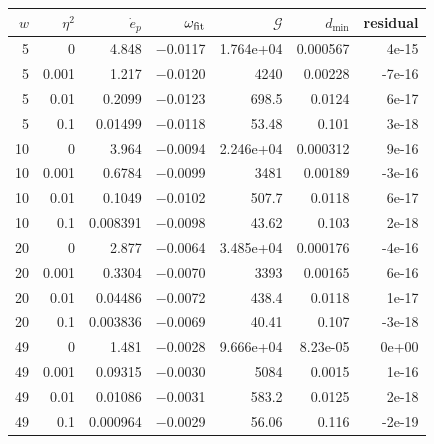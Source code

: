\begin{tabular}{rrrrrrr}\toprule $w$ & $\eta^2$ & $\dot e_p$ & $\omega_{\rm fit}$ & $\mathcal G$ & $d_{\min}$ & residual\\\midrule
5 & 0 & 4.848 & $-$0.0117 & 1.764e+04 & 0.000567 & 4e-15\\
5 & 0.001 & 1.217 & $-$0.0120 & 4240 & 0.00228 & -7e-16\\
5 & 0.01 & 0.2099 & $-$0.0123 & 698.5 & 0.0124 & 6e-17\\
5 & 0.1 & 0.01499 & $-$0.0118 & 53.48 & 0.101 & 3e-18\\
10 & 0 & 3.964 & $-$0.0094 & 2.246e+04 & 0.000312 & 9e-16\\
10 & 0.001 & 0.6784 & $-$0.0099 & 3481 & 0.00189 & -3e-16\\
10 & 0.01 & 0.1049 & $-$0.0102 & 507.7 & 0.0118 & 6e-17\\
10 & 0.1 & 0.008391 & $-$0.0098 & 43.62 & 0.103 & 2e-18\\
20 & 0 & 2.877 & $-$0.0064 & 3.485e+04 & 0.000176 & -4e-16\\
20 & 0.001 & 0.3304 & $-$0.0070 & 3393 & 0.00165 & 6e-16\\
20 & 0.01 & 0.04486 & $-$0.0072 & 438.4 & 0.0118 & 1e-17\\
20 & 0.1 & 0.003836 & $-$0.0069 & 40.41 & 0.107 & -3e-18\\
49 & 0 & 1.481 & $-$0.0028 & 9.666e+04 & 8.23e-05 & 0e+00\\
49 & 0.001 & 0.09315 & $-$0.0030 & 5084 & 0.0015 & 1e-16\\
49 & 0.01 & 0.01086 & $-$0.0031 & 583.2 & 0.0125 & 2e-18\\
49 & 0.1 & 0.000964 & $-$0.0029 & 56.06 & 0.116 & -2e-19\\
\bottomrule\end{tabular}
